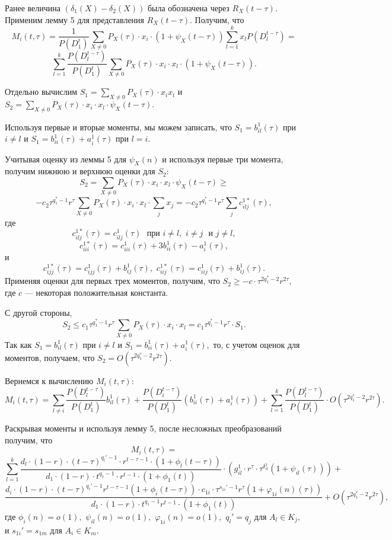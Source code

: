 \documentclass[12pt,russian]{article}
\begin{document}
{Ранее величина $\left(\delta_1(X)-\delta_2(X)\right)$ была обозначена
через $R_X(t-\tau).$
Применим лемму 5 для представления $R_X(t-\tau).$ Получим, что
$$
M_i(t,\tau)=\frac{1}{P(D^t_1)} \sum_{X \ne 0} P_X(\tau)\cdot x_{i}\cdot
\left(1+\psi_X(t-\tau)\right)
\sum_{l=1}^k x_l P(D_l^{t-\tau})=
$$
$$
\sum_{l=1}^k\frac{P(D_l^{t-\tau})}{P(D^t_1)}
\sum_{X \ne 0} P_X(\tau)\cdot x_{i}\cdot
x_{l}\cdot\left(1+\psi_X(t-\tau)\right).
$$

Отдельно вычислим
$S_1=
\sum_{X \ne 0} P_X(\tau)\cdot x_{i}x_{l} $
и
$S_2=
\sum_{X \ne 0} P_X(\tau)\cdot x_{i}\cdot x_{l} \cdot \psi_X(t-\tau).$

Используя первые и вторые моменты, мы можем записать, что
$S_1=b^1_{il}(\tau)$ при $i \ne l$ и
$S_1=b^1_{ii}(\tau)+a^1_i(\tau)$ при $l=i.$

Учитывая оценку из леммы 5 для $\psi_X(n)$ и используя
первые три момента, получим нижнюю и верхнюю
оценки для $S_2:$
$$
S_2 =
\sum_{X \ne 0} P_X(\tau)\cdot x_{i}\cdot x_{l} \cdot \psi_X(t-\tau)\ge
$$
$$
-c_2 \tau^{q^{*}_1-1} r^{\tau} \sum_{X \ne 0} P_X(\tau)\cdot x_{i}\cdot x_{l} \cdot
\sum_j x_{j}=- c_2 \tau^{q^{*}_1-1} r^{\tau}\sum_j c^{1*}_{ilj}(\tau),
$$
где
$$
c^{1*}_{ilj}(\tau)=c^{1}_{ilj}(\tau)
\,\, \mbox { при} \,\, i \ne l, \,\,i \ne j \,\,\mbox { и}\,\, j \ne l,
$$
$$
c^{1*}_{iii}(\tau)=c^{1}_{iii}(\tau)+3 b^1_{ii}(\tau)-a^1_{i}(\tau),
$$
и
$$
c^{1*}_{ijj}(\tau)=c^{1}_{ijj}(\tau)+b^1_{ij}(\tau),\,\,
c^{1*}_{iij}(\tau)=c^{1}_{iij}(\tau)+b^1_{ij}(\tau).
$$
Применяя оценки для первых трех моментов, получим, что
$S_2 \ge -c \cdot\tau^{2 q^{*}_1-2} r^{2 \tau},$
где $c$ --- некоторая положительная константа.

С другой стороны,
$$
S_2  \le c_1 \tau^{q^{*}_1-1} r^{\tau}
\sum_{X \ne 0} P_X(\tau)\cdot x_{i}\cdot x_{l}= c_1\tau^{q^{*}_1-1} r^{\tau}\cdot S_1.
$$
Так как $S_1=b^1_{il}(\tau)$ при $i \ne l$ и $S_1=b^1_{ii}(\tau)+a^1_i(\tau),$
то, с учетом оценок для моментов, получаем, что $S_2=O(\tau^{2q^{*}_1-2}r^{2\tau}).$

Вернемся к вычислению $M_i(t,\tau):$
$$
M_i(t,\tau)=
\sum_{l\ne i} \frac{P(D_l^{t-\tau})}{P(D^t_1)}
b^1_{il}(\tau)+ \frac{P(D_i^{t-\tau})}{P(D^t_1)}
\left(b^1_{ii}(\tau)+a^1_i(\tau) \right)+
\sum_{l=1}^k\frac{P(D_l^{t-\tau})}{P(D^t_1)} \cdot O\left(\tau^{2q^{*}_1-2}r^{2\tau}\right).
$$

Раскрывая моменты и используя лемму 5, после
несложных преобразований получим, что
$$
M_i(t,\tau)=
$$
$$
\sum_{l=1}^{k} \frac{d_l \cdot(1-r)\cdot (t-\tau)^{q_l'-1} \cdot r^{t-\tau-1} \cdot (1+\phi_l(t-\tau))}
{d_1 \cdot (1-r)\cdot t^{q_1-1} \cdot r^{t-1} \cdot (1+\phi_1(t))}\cdot
\left(g_{il}^1 \cdot r^{\tau}\cdot \tau^{\delta_{il}^1}  \left(1+\psi_{il}(\tau)\right)\right)+
$$
$$
\frac{d_i \cdot (1-r) \cdot (t-\tau)^{q_i'-1} r^{t-\tau-1}(1+\phi_i(t-\tau)) \cdot c_{1i}\cdot 
\tau^{s_{1i}'-1} r^{\tau}(1+\varphi_{1i}(n)(\tau))}
{d_1\cdot (1-r)\cdot t^{q_1-1}r^{t-1} \cdot(1+\phi_1(t))}+ O\left(\tau^{2q^{*}_1-2}r^{2\tau}\right),
$$
где $\phi_i(n)=o(1),$ $\psi_{il}(n)=o(1),$ $\varphi_{1i}(n)=o(1),$ $q_l'=q_j$ для $A_l \in K_j,$ и $s_{1i}'=s_{1m}$ для  $A_i \in K_m.$

}
\end{document}
